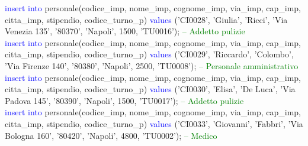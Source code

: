 \documentclass{article}
\begin{document}
\begin{flushleft}
{        \vspace{2mm}
        \hspace*{0.5em}\textcolor{blue}{insert into} personale(codice\_imp, nome\_imp, cognome\_imp, via\_imp, cap\_imp, \hspace*{0.5em}citta\_imp, stipendio, codice\_turno\_p) \textcolor{blue}{values} ('CI0028', 'Giulia', 'Ricci', 'Via \hspace*{0.5em}Venezia 135', \hspace*{0.5em}'80370', 'Napoli', 1500, 'TU0016'); \hspace*{0.5em} \textcolor{green}{-- Addetto pulizie} \\
        \vspace{2mm}
        \hspace*{0.5em}\textcolor{blue}{insert into} personale(codice\_imp, nome\_imp, cognome\_imp, via\_imp, cap\_imp, \hspace*{0.5em}citta\_imp, stipendio, codice\_turno\_p) \textcolor{blue}{values} ('CI0029', 'Riccardo', 'Colombo', \hspace*{0.5em}'Via Firenze \hspace*{0.5em}140', '80380', 'Napoli', 2500, 'TU0008'); \hspace*{0.5em} \textcolor{green}{-- Personale \hspace*{0.5em}amministrativo} \\
        \vspace{2mm}
        \hspace*{0.5em}\textcolor{blue}{insert into} personale(codice\_imp, nome\_imp, cognome\_imp, via\_imp, cap\_imp, \hspace*{0.5em}citta\_imp, stipendio, codice\_turno\_p) \textcolor{blue}{values} ('CI0030', 'Elisa', 'De Luca', 'Via \hspace*{0.5em}Padova 145', \hspace*{0.5em}'80390', 'Napoli', 1500, 'TU0017'); \hspace*{0.5em} \textcolor{green}{-- Addetto pulizie} \\
        \vspace{2mm}
        \hspace*{0.5em}\textcolor{blue}{insert into} personale(codice\_imp, nome\_imp, cognome\_imp, via\_imp, cap\_imp, \hspace*{0.5em}citta\_imp, stipendio, codice\_turno\_p) \textcolor{blue}{values} ('CI0033', 'Giovanni', 'Fabbri', \hspace*{0.5em}'Via Bologna 160', \hspace*{0.5em}'80420', 'Napoli', 4800, 'TU0002'); \hspace*{0.5em} \textcolor{green}{-- Medico} \\
}
\end{flushleft}
\end{document}
